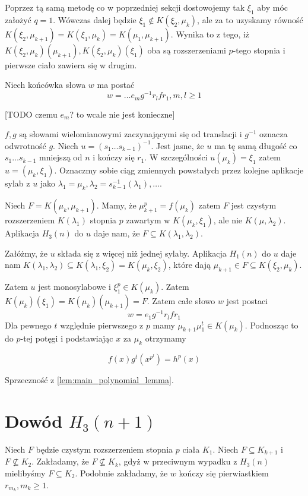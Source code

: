 Poprzez tą samą metodę co w poprzedniej sekcji dostowojemy tak $\xi_1$ aby móc
założyć $q = 1$. Wówczas dalej będzie $\xi_1 \not \in K\left(\xi_2,
\mu_k\right)$, ale za to uzyskamy równość
$K\left(\xi_2, \mu_{k+1}\right)
= K\left(\xi_1, \mu_k\right)
= K\left(\mu_1, \mu_{k+1}\right)$. Wynika to z tego, iż
$
K\left(\xi_2, \mu_{k}\right) \left(\mu_{k+1}\right),
K\left(\xi_2, \mu_{k}\right) \left(\xi_{1}\right)$ oba są rozszerzeniami
$p$-tego stopnia i pierwsze ciało zawiera się w drugim.

Niech końcówka słowa $w$ ma postać
\[ w = \ldots e_mg^{-1}r_lfr_1, m,l \geq 1\]

[TODO czemu $e_m$? to wcale nie jest konieczne]

$f, g$ są słowami wielomianowymi zaczynającymi się od translacji i $g^{-1}$
oznacza odwrotność $g$. Niech $u = \left(s_1 \ldots s_{k-1}\right)^{-1}$. Jest
jasne, że $u$ ma tę samą długość co $s_1\ldots s_{k-1}$ mniejszą od $n$ i kończy
się $r_1$. W szczególności $u\left(\mu_k\right) = \xi_1$ zatem $u = \left(\mu_k,
\xi_1\right)$. Oznaczmy sobie ciąg zmiennych powstałych przez kolejne aplikacje
sylab z $u$ jako $\lambda_1 = \mu_k, \lambda_2 =
s_{k-1}^{-1}\left(\lambda_1\right), \ldots$.

Niech $F = K \left(\mu_k, \mu_{k+1}\right)$. Mamy, że
$\mu_{k+1}^p = f\left(\mu_k\right)$ zatem $F$ jest czystym rozszerzeniem
$K\left(\lambda_1 \right)$ stopnia $p$ zawartym w $K \left( \mu_k, \xi_1
\right)$, ale nie $K \left(\mu, \lambda_2 \right)$.
Aplikacja $H_3(n)$ do $u$ daje nam, że $F \subseteq K \left( \lambda_1,
\lambda_2 \right)$.

Załóżmy, że $u$ składa się z więcej niż jednej sylaby. Aplikacja $H_1(n)$ do $u$
daje nam
$K \left( \lambda_1, \lambda_2 \right) \subseteq K \left( \lambda_1, \xi_2
\right) = K \left( \mu_k, \xi_2 \right)$, które dają $\mu_{k+1} \in F \subseteq
K \left( \xi_2, \mu_k \right)$.

Zatem $u$ jest monosylabowe i $\xi_1^p \in K \left( \mu_k\right)$. Zatem
$K \left( \mu_k \right) \left(\xi_1 \right) = K \left(\mu_k \right)
\left(\mu_{k+1} \right) = F$. Zatem całe słowo $w$ jest postaci
\[w = e_1 g^{-1}r_lfr_1\]
Dla pewnego $t$ względnie pierwszego z $p$ mamy $\mu_{k+1} \mu_1^t \in K \left(
\mu_k \right)$.  Podnosząc to do $p$-tej potęgi i podstawiając $x$ za $\mu_k$
otrzymamy

\[f(x)g^t \left( x^{p^l} \right) = h^p(x)\]

Sprzeczność z \ref{lem:main_polynomial_lemma}.


\section{Dowód $H_3(n+1)$}
Niech $F$ będzie czystym rozszerzeniem stopnia $p$ ciała $K_1$. Niech $F
\subseteq K_{k+1}$ i $F \not \subseteq K_2$. Zakładamy, że $F \not \subseteq
K_k$, gdyż w przeciwnym wypadku z $H_3(n)$ mielibyśmy $F \subseteq K_2$.
Podobnie zakładamy, że $w$ kończy się pierwiastkiem $r_{m_k}, m_k \geq 1$.

